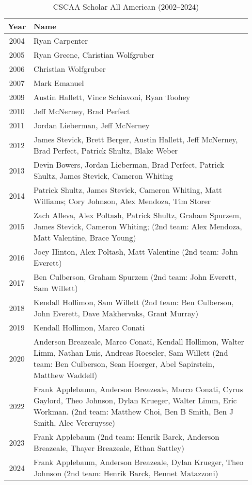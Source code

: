 \begin{table}[htbp]
    \centering
    \small
    \caption*{CSCAA Scholar All-American (2002--2024)}
    \begin{tabular}{c p{}}
    \toprule
    Year & Name \\
    \midrule
    2004 & Ryan Carpenter \\
    2005 & Ryan Greene, Christian Wolfgruber \\
    2006 & Christian Wolfgruber \\
    2007 & Mark Emanuel \\
    2009 & Austin Hallett, Vince Schiavoni, Ryan Toohey \\
    2010 & Jeff McNerney, Brad Perfect \\
    2011 & Jordan Lieberman, Jeff McNerney \\
    2012 & James Stevick, Brett Berger, Austin Hallett, Jeff McNerney, Brad Perfect, Patrick Shultz, Blake Weber \\
    2013 & Devin Bowers, Jordan Lieberman, Brad Perfect, Patrick Shultz, James Stevick, Cameron Whiting \\
    2014 & Patrick Shultz, James Stevick, Cameron Whiting, Matt Williams; Cory Johnson, Alex Mendoza, Tim Storer \\
    2015 & Zach Alleva, Alex Poltash, Patrick Shultz, Graham Spurzem, James Stevick, Cameron Whiting; (2nd team: Alex Mendoza, Matt Valentine, Brace Young) \\
    2016 & Joey Hinton, Alex Poltash, Matt Valentine (2nd team: John Everett) \\
    2017 & Ben Culberson, Graham Spurzem (2nd team: John Everett, Sam Willett) \\
    2018 & Kendall Hollimon, Sam Willett (2nd team: Ben Culberson, John Everett, Dave Makhervaks, Grant Murray) \\
    2019 & Kendall Hollimon, Marco Conati \\
    2020 & Anderson Breazeale, Marco Conati, Kendall Hollimon, Walter Limm, Nathan Luis, Andreas Roeseler, Sam Willett (2nd team: Ben Culberson, Sean Hoerger, Abel Sapirstein, Matthew Waddell) \\
    2022 & Frank Applebaum, Anderson Breazeale, Marco Conati, Cyrus Gaylord, Theo Johnson, Dylan Krueger, Walter Limm, Eric Workman. (2nd team: Matthew Choi, Ben B Smith, Ben J Smith, Alec Vercruysse) \\
    2023 & Frank Applebaum (2nd team: Henrik Barck, Anderson Breazeale, Thayer Breazeale, Ethan Sattley) \\
    2024 & Frank Applebaum, Anderson Breazeale, Dylan Krueger, Theo Johnson (2nd team: Henrik Barck, Bennet Matazzoni) \\
    \bottomrule
    \end{tabular}
    \end{table}
    


